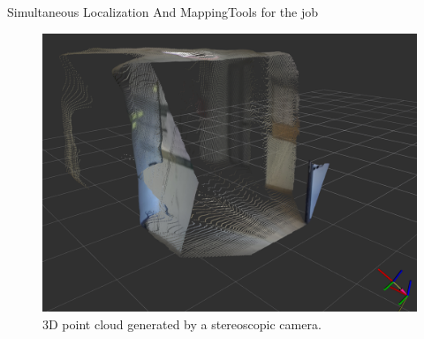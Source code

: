 \begin{frame}{Simultaneous Localization And Mapping}{Tools for the job}
  \begin{figure}
    \centering
    \includegraphics[width=.5\textwidth]{pointcloud}
    \caption{3D point cloud generated by a stereoscopic camera.}
    \label{fig:pointcloud}
  \end{figure}
\end{frame}


